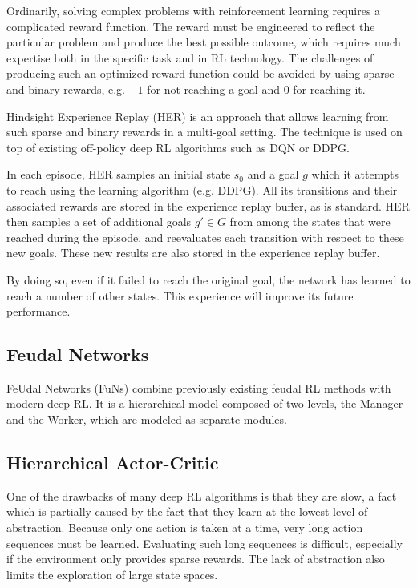 \documentclass[runningheads]{llncs}
\begin{document}
Ordinarily, solving complex problems with reinforcement learning requires a complicated reward function. The reward must be engineered to reflect the particular problem and produce the best possible outcome, which requires much expertise both in the specific task and in RL technology. The challenges of producing such an optimized reward function could be avoided by using sparse and binary rewards, e.g. $-1$ for not reaching a goal and $0$ for reaching it.

Hindsight Experience Replay (HER) \cite{andrychowicz2017hindsight} is an approach that allows learning from such sparse and binary rewards in a multi-goal setting. The technique is used on top of existing off-policy deep RL algorithms such as DQN or DDPG.

In each episode, HER samples an initial state $s_0$ and a goal $g$ which it attempts to reach using the learning algorithm (e.g. DDPG). All its transitions and their associated rewards are stored in the experience replay buffer, as is standard. HER then samples a set of additional goals $g' \in G$ from among the states that were reached during the episode, and reevaluates each transition with respect to these new goals. These new results are also stored in the experience replay buffer.

By doing so, even if it failed to reach the original goal, the network has learned to reach a number of other states. This experience will improve its future performance.

\subsection{Feudal Networks}

FeUdal Networks (FuNs) \cite{vezhnevets2017feudal} combine previously existing feudal RL methods \cite{dayan1993feudal} with modern deep RL. It is a hierarchical model composed of two levels, the Manager and the Worker, which are modeled as separate modules.

\subsection{Hierarchical Actor-Critic}

One of the drawbacks of many deep RL algorithms is that they are slow, a fact which is partially caused by the fact that they learn at the lowest level of abstraction. Because only one action is taken at a time, very long action sequences must be learned. Evaluating such long sequences is difficult, especially if the environment only provides sparse rewards. The lack of abstraction also limits the exploration of large state spaces.
\end{document}
